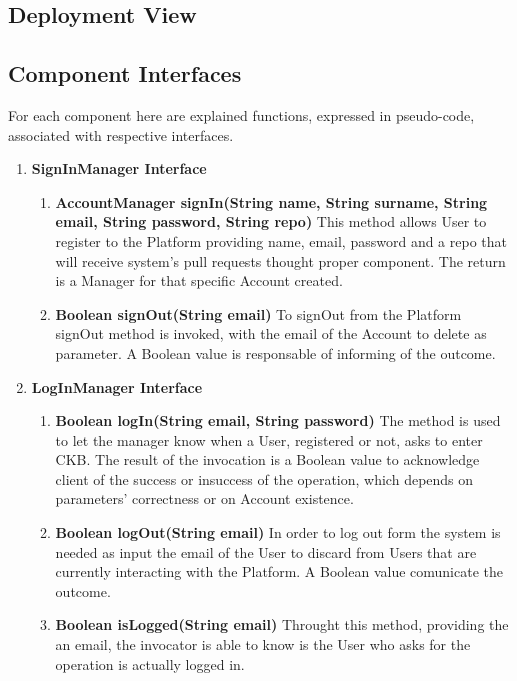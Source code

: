 \subsection{Deployment View}
\subsection{Component Interfaces}
For each component here are explained functions, expressed in pseudo-code, associated with respective interfaces.
\begin{enumerate}
    \item \textbf{SignInManager Interface} 
            \begin{enumerate}[label=$\bullet$]
                \item \textbf{AccountManager signIn(String name, String surname, String email, String password, String repo)} This method allows User to register to the Platform providing name, email, password and a repo that will receive system's pull requests thought proper component. The return is a Manager for that specific Account created.
                \item \textbf{Boolean signOut(String email)} To signOut from the Platform signOut method is invoked, with the email of the Account to delete as parameter. A Boolean value is responsable of informing of the outcome.
            \end{enumerate}
    \item \textbf{LogInManager Interface}
        \begin{enumerate}[label=$\bullet$]
            \item \textbf{Boolean logIn(String email, String password)} The method is used to let the manager know when a User, registered or not, asks to enter CKB. The result of the invocation is a Boolean value to acknowledge client of the success or insuccess of the operation, which depends on parameters' correctness or on Account existence.
            \item \textbf{Boolean logOut(String email)} In order to log out form the system is needed as input the email of the User to discard from Users that are currently interacting with the Platform. A Boolean value comunicate the outcome.
            \item \textbf{Boolean isLogged(String email)} Throught this method, providing the an email, the invocator is able to know is the User who asks for the operation is actually logged in.
        \end{enumerate}

\end{enumerate}
